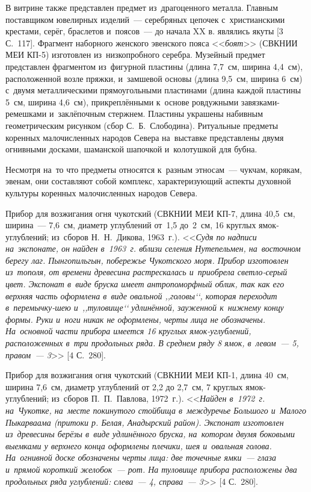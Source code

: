 В витрине также представлен предмет из~драгоценного металла. Главным поставщиком ювелирных изделий~--- серебряных цепочек с~христианскими крестами, серёг, браслетов и~поясов~--- до начала XX в. являлись якуты [3 С.~117]. Фрагмент наборного женского эвенского пояса <<\textit{боят}>> (СВКНИИ МЕИ КП-5) изготовлен из~низкопробного серебра. Музейный предмет представлен фрагментом из~фигурной пластины (длина 7,7~см, ширина 4,4~см), расположенной возле пряжки, и~замшевой основы (длина 9,5~см, ширина 6~см) с~двумя металлическими прямоугольными пластинами (длина каждой пластины 5~см, ширина 4,6~см), прикреплёнными к~основе ровдужными завязками-ремешками и~заклёпочным стержнем. Пластины украшены набивным геометрическим рисунком (сбор \enlargethispage{2\baselineskip}С.~Б.~Слободина).
\clearpage
Ритуальные предметы коренных малочисленных народов Севера на~выставке представлены двумя огнивными досками, шаманской шапочкой и~колотушкой для бубна.

Несмотря на~то что предметы относятся к~разным этносам~--- чукчам, корякам, эвенам, они составляют собой комплекс, характеризующий аспекты духовной культуры коренных малочисленных народов Севера.

Прибор для возжигания огня чукотский (СВКНИИ МЕИ КП-7, длина 40,5~см, ширина~--- 7,6~см, диаметр углублений от~1,5 до~2~см, 16 круглых ямок-углублений; из~сборов Н.~Н.~Дикова, 1963~г.). <<\textit{Судя по надписи на~экспонате, он найден в~1963~г. вблизи селения Нутепельмен, на~восточном берегу лаг. Пынгопильгын, побережье Чукотского моря. Прибор изготовлен из~тополя, от времени древесина растрескалась и~приобрела светло-серый цвет. Экспонат в~виде бруска имеет антропоморфный облик, так как его верхняя часть оформлена в~виде овальной ,,\textit{головы}‘‘, которая переходит в~перемычку-шею и~,,\textit{туловище}‘‘ удлинённой, зауженной к~нижнему концу формы. Руки и~ноги никак не оформлены, черты лица не обозначены. На~основной части прибора имеется 16 круглых ямок-углублений, расположенных в~три продольных ряда. В среднем ряду 8 ямок, в~левом~--- 5, правом~--- 3}>> [4 С.~280].

Прибор для возжигания огня чукотский (СВКНИИ МЕИ КП-1, длина 40~см, ширина 7,6~см, диаметр углублений от 2,2 до 2,7~см, 7 круглых ямок-углублений; из~сборов П.~П.~Павлова, 1972~г.). <<\textit{Найден в~1972~г. на~Чукотке, на~месте покинутого стойбища в~междуречье Большого и~Малого Пыкарваама (притоки р. Белая, Анадырский район). Экспонат изготовлен из~древесины берёзы в~виде удлинённого бруска, на~котором двумя боковыми выемками у верхнего конца оформлены плечики, шея и~овальная голова. На~огнивной доске обозначены черты лица: две точечные ямки~--- глаза и~прямой короткий желобок~--- рот. На туловище прибора расположены два продольных ряда углублений: слева~--- 4, справа~--- 3}>> [4 С.~280].

